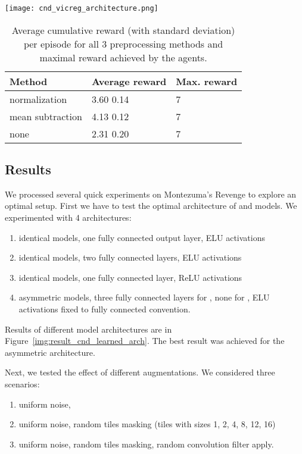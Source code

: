 \documentclass[a4paper,11pt]{elsarticle}
\begin{document}
\begin{figure*}[t!]
\centering
\texttt{[image: cnd\_vicreg\_architecture.png]}
\caption{Agent's performance based on various learned model architectures, evaluated in terms of the overall score, external reward obtained and the number of rooms explored.}
\label{img:result_cnd_learned_arch}
\end{figure*}

\begin{table}[thb]
\scriptsize
\centering
\caption{Average cumulative reward (with standard deviation) per episode for all 3 preprocessing methods and maximal reward achieved by the agents.}
\begin{tabular}{l|ll}
Method & Average reward & Max. reward \\
\hline\hline
normalization    & 3.60  0.14 & 7 \\ 
mean subtraction & 4.13  0.12 & 7 \\
none & 2.31  0.20 & 7 \\
\hline
\end{tabular}
\label{tab:res1}
\end{table}

\subsection{Results}

We processed several quick experiments on Montezuma's Revenge to explore an optimal setup.
First we have to test the optimal architecture of  and  models. 
We experimented with 4 architectures: 
\begin{enumerate}
    \item identical models, one fully connected output layer, ELU activations
    \item identical models, two fully connected layers, ELU activations
    \item identical models, one fully connected layer, ReLU activations
    \item asymmetric models, three fully connected layers for , none for , ELU activations fixed to fully connected convention.
\end{enumerate}
Results of different model architectures are in Figure~\ref{img:result_cnd_learned_arch}. The best result was achieved for the asymmetric architecture.

Next, we tested the effect of different augmentations. We considered three scenarios: 
\begin{enumerate}
    \item uniform noise, 
    \item uniform noise, random tiles masking (tiles with sizes 1, 2, 4, 8, 12, 16)
    \item uniform noise,  random tiles masking, random convolution filter apply.
\end{enumerate}
\end{document}
